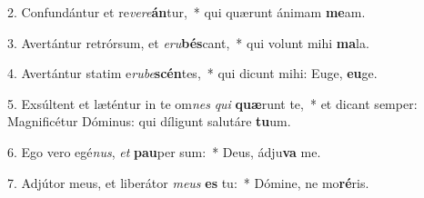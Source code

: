 2. Confundántur et re\textit{ve}\textit{re}\textbf{án}tur,~*  qui quærunt ánimam \textbf{me}am.\

3. Avertántur retrórsum, et \textit{e}\textit{ru}\textbf{bés}cant,~*  qui volunt mihi \textbf{ma}la.\

4. Avertántur statim e\textit{ru}\textit{be}\textbf{scén}tes,~*  qui dicunt mihi: Euge, \textbf{eu}ge.\

5. Exsúltent et læténtur in te om\textit{nes} \textit{qui} \textbf{quæ}runt te,~*  et dicant semper: Magnificétur Dóminus: qui díligunt salutáre \textbf{tu}um.\

6. Ego vero egé\textit{nus}, \textit{et} \textbf{pau}per sum:~*  Deus, ádju\textbf{va} me.\

7. Adjútor meus, et liberátor \textit{me}\textit{us} \textbf{es} tu:~*  Dómine, ne mo\textbf{ré}ris.\

